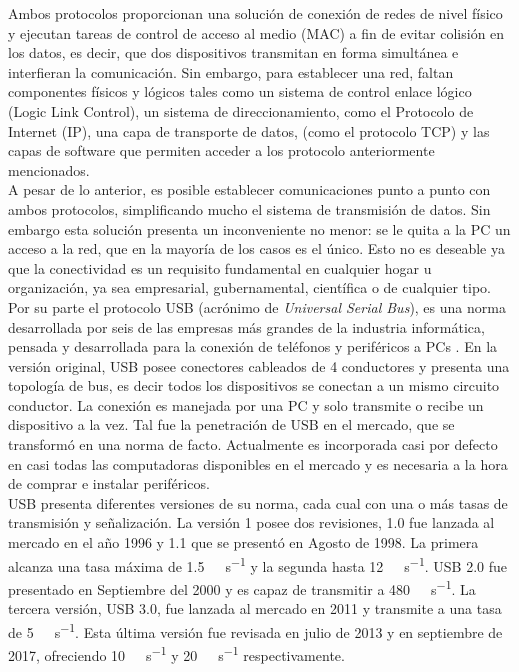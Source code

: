 Ambos protocolos proporcionan una solución de conexión de redes de nivel físico y ejecutan tareas de control de acceso al medio (MAC) a fin de evitar colisión en los datos, es decir, que dos dispositivos transmitan en forma simultánea e interfieran la comunicación.
Sin embargo, para establecer una red, faltan componentes físicos y lógicos tales como un sistema de control enlace lógico (Logic Link Control), un sistema de direccionamiento, como el Protocolo de Internet (IP), una capa de transporte de datos, (como el protocolo TCP) y las capas de software que permiten acceder a los protocolo anteriormente mencionados.\\

A pesar de lo anterior, es posible establecer comunicaciones punto a punto con ambos protocolos, simplificando mucho el sistema de transmisión de datos. Sin embargo esta solución presenta un inconveniente no menor: se le quita a la PC un acceso a la red, que en la mayoría de los casos es el único. Esto no es deseable ya que la conectividad es un requisito fundamental en cualquier hogar u organización, ya sea empresarial, gubernamental, científica o de cualquier tipo.\\

Por su parte el protocolo USB (acrónimo de {\it Universal Serial Bus}), es una norma desarrollada por seis de las empresas más grandes de la industria informática, pensada y desarrollada para la conexión de teléfonos y periféricos a PCs \cite{USBspec}. En la versión original, USB posee conectores cableados de 4 conductores y presenta una topología de bus, es decir todos los dispositivos se conectan a un mismo circuito conductor. La conexión es manejada por una PC y solo transmite o recibe un dispositivo a la vez. Tal fue la penetración de USB en el mercado, que se transformó en una norma de facto. Actualmente es incorporada casi por defecto en casi todas las computadoras disponibles en el mercado y es necesaria a la hora de comprar e instalar periféricos.\\

USB presenta diferentes versiones de su norma, cada cual con una o más tasas de transmisión y señalización. La versión 1 posee dos revisiones, 1.0 fue lanzada al mercado en el año 1996 y 1.1 que se presentó en Agosto de 1998. La primera alcanza una tasa máxima de \SI{1.5}{\mega\bit\per\second} y la segunda hasta \SI{12}{\mega\bit\per\second}. USB 2.0 fue presentado en Septiembre del 2000 y es capaz de transmitir a \SI{480}{\mega\bit\per\second}. La tercera versión, USB 3.0, fue lanzada al mercado en 2011 y transmite a una tasa de \SI{5}{\giga\bit\per\second}. Esta última versión fue revisada en julio de 2013 y en septiembre de 2017, ofreciendo \SI{10}{\giga\bit\per\second} y \SI{20}{\giga\bit\per\second} respectivamente.\\

